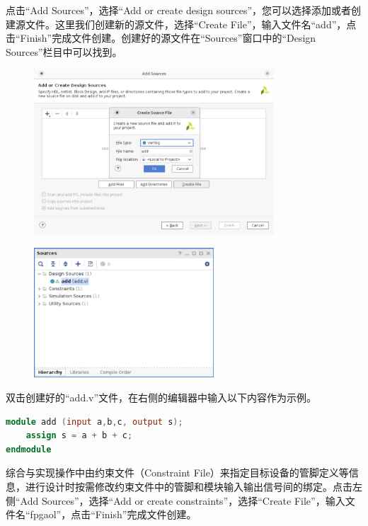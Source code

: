 \documentclass{ctexart}
\begin{document}
点击“Add Sources”，选择“Add or create design sources”，您可以选择添加或者创建源文件。这里我们创建新的源文件，选择“Create File”，输入文件名“add”，点击“Finish”完成文件创建。创建好的源文件在“Sources”窗口中的“Design Sources”栏目中可以找到。

\begin{figure}[H]
    \centering
    \includegraphics[width=0.8\textwidth]{lab0/17.png}
\end{figure}

\begin{figure}[H]
    \centering
    \includegraphics[width=0.6\textwidth]{lab0/18.png}
\end{figure}

双击创建好的“add.v”文件，在右侧的编辑器中输入以下内容作为示例。

\begin{lstlisting}[language=Verilog]
module add (input a,b,c, output s);
    assign s = a + b + c;
endmodule
\end{lstlisting}

综合与实现操作中由约束文件（Constraint File）来指定目标设备的管脚定义等信息，进行设计时按需修改约束文件中的管脚和模块输入输出信号间的绑定。点击左侧“Add Sources”，选择“Add or create constraints”，选择“Create File”，输入文件名“fpgaol”，点击“Finish”完成文件创建。
\end{document}
